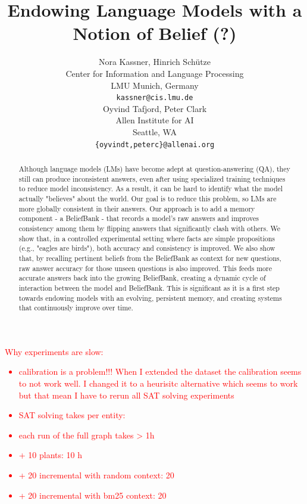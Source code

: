 \documentclass[11pt]{article}
\title{Endowing Language Models with a Notion of Belief (?)}
\author{Nora Kassner, Hinrich Sch{\"u}tze \\
Center for Information and Language Processing \\
LMU Munich, Germany \\
\texttt{kassner@cis.lmu.de} \\ \And
Oyvind Tafjord, Peter Clark \\
Allen Institute for AI \\
Seattle, WA \\
\texttt{\{oyvindt,peterc\}@allenai.org} \\
}
\newcommand{\red}[1]{\textcolor{red}{#1}}
\begin{document}
\maketitle
\begin{abstract}
Although language models (LMs) have become adept at question-answering (QA), they
still can produce inconsistent answers, 
even after using specialized training techniques to reduce model inconsistency. As a result, it can be hard to identify
what the model actually
"believes" about the world. Our goal is to reduce this problem, so LMs are 
more globally consistent in their answers. Our approach is to add a memory
component - a BeliefBank - that records a model's raw answers and improves
consistency among them by flipping answers that significantly clash with others.
We show that, in a controlled experimental setting where facts are simple
propositions (e.g., "eagles are birds"), both accuracy and consistency
is improved. We also show that, by recalling pertinent beliefs from the
BeliefBank as context for new questions, raw answer accuracy for those unseen
questions is also improved. This feeds more accurate answers back into the growing
BeliefBank, creating a dynamic cycle of interaction between the model and BeliefBank.
This is significant as it is a first step towards endowing models with an evolving,
persistent memory, and creating systems that continuously improve over time.
\end{abstract}


\red{Why experiments are slow:
\begin{itemize}
    \item calibration is a problem!!! When I extended the dataset the calibration seems to not work well. I changed it to a heurisitc alternative which seems to work but that mean I have to rerun all SAT solving experiments
    \item SAT solving takes per entity: 
    \item each run of the full graph takes > 1h
    \item + 10 plants: 10 h
    \item + 20 incremental with random context: 20
    \item + 20 incremental with bm25 context: 20
\end{itemize}}
\end{document}
